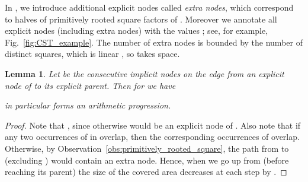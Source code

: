 \documentclass{article}
\theoremstyle{theorem}
\newtheorem{lemma}{Lemma}
\theoremstyle{definition}
\begin{document}
  In , we introduce additional explicit nodes called \emph{extra nodes}, 
  which correspond to halves of primitively rooted square factors of .
  Moreover we annotate all explicit nodes (including extra nodes) with the values
  ; see, for example, Fig.~\ref{fig:CST_example}.
  The number of extra nodes is bounded by the number of distinct squares, which is linear \cite{DBLP:journals/jct/FraenkelS98},
  so  takes  space.
 
  \begin{lemma}\label{lem:formula}
    Let  be the consecutive implicit nodes on the edge from an explicit node  of 
    to its explicit parent.
    Then for  we have
    
    in particular  forms an arithmetic progression.
  \end{lemma}
  \begin{proof}
    Note that , since otherwise  would be an explicit node of .
    Also note that if any two occurrences of  in  overlap, then the corresponding
    occurrences of  overlap.
    Otherwise, by Observation~\ref{obs:primitively_rooted_square},
    the path from  to  (excluding ) would contain an extra node.
    Hence, when we go up from  (before reaching its parent) the size of the covered area
    decreases at each step by .
  \end{proof}
\end{document}
